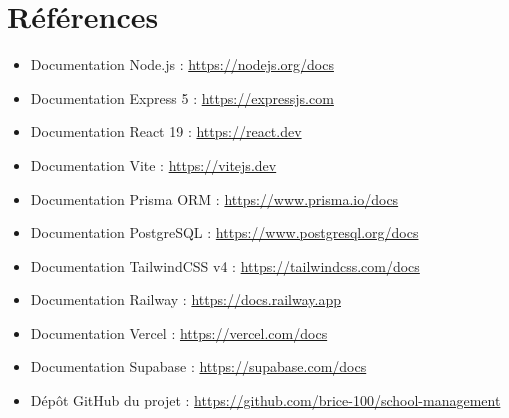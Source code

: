 \documentclass[12pt,a4paper]{report}
\begin{document}
\section{Références}
\begin{itemize}[leftmargin=*]
    \item Documentation Node.js : \url{https://nodejs.org/docs}
    \item Documentation Express 5 : \url{https://expressjs.com}
    \item Documentation React 19 : \url{https://react.dev}
    \item Documentation Vite : \url{https://vitejs.dev}
    \item Documentation Prisma ORM : \url{https://www.prisma.io/docs}
    \item Documentation PostgreSQL : \url{https://www.postgresql.org/docs}
    \item Documentation TailwindCSS v4 : \url{https://tailwindcss.com/docs}
    \item Documentation Railway : \url{https://docs.railway.app}
    \item Documentation Vercel : \url{https://vercel.com/docs}
    \item Documentation Supabase : \url{https://supabase.com/docs}
    \item Dépôt GitHub du projet : \url{https://github.com/brice-100/school-management}
\end{itemize}
 
\end{document}
